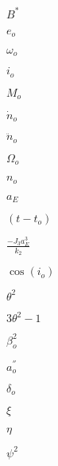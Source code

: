 \documentclass[10pt]{article}
\begin{document}
$ B^{*} $

$ e_{o} $

$ \omega_{o} $

$ i_{o} $

$ M_{o} $

$ \dot{n}_{o} $

$ \ddot{n}_{o} $

$ \Omega_{o} $

$ n_{o} $

$ a_{E} $

$ (t - t_{o}) $

$ \frac{-J_{3} a_{E}^{3}}{k_{2}} $

$ \cos(i_{o}) $

$ \theta^{2} $

$ 3 \theta^{2} - 1 $

$ \beta_{o}^{2} $

$ a_{o}^{''} $

$ \delta_{o} $

$ \xi $

$ \eta $

$ \psi^{2} $
\end{document}
